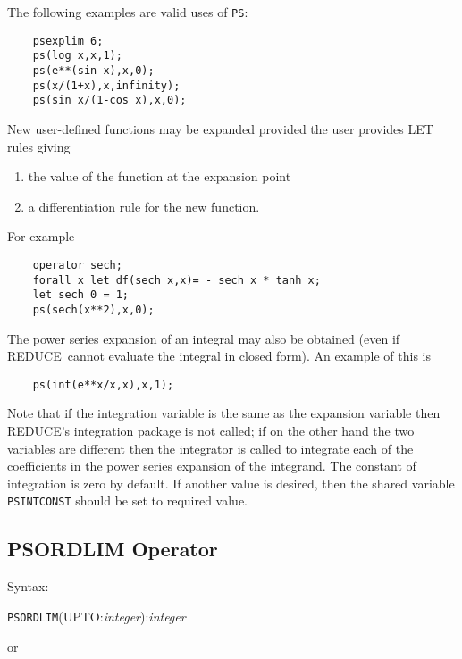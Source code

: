 \documentclass[11pt,letterpaper]{book}
\newcommand{\REDUCE}{REDUCE}
\begin{document}
\noindent The following examples are valid uses of {\tt PS}:
{\small\begin{verbatim}
    psexplim 6;
    ps(log x,x,1);
    ps(e**(sin x),x,0);
    ps(x/(1+x),x,infinity);
    ps(sin x/(1-cos x),x,0);
\end{verbatim}}

New user-defined functions may be expanded provided the user provides
LET rules giving

\begin{enumerate}
\item the value of the function at the expansion point
\item a differentiation rule for the new function.
\end{enumerate}

\noindent For example
{\small\begin{verbatim}
    operator sech;
    forall x let df(sech x,x)= - sech x * tanh x;
    let sech 0 = 1;
    ps(sech(x**2),x,0);
\end{verbatim}}

The power series expansion of an integral may also be obtained (even if
\REDUCE\ cannot evaluate the integral in closed form).  An example of
this is

{\small\begin{verbatim}
    ps(int(e**x/x,x),x,1);
\end{verbatim}}

Note that if the integration variable is the same as the expansion
variable then \REDUCE's integration package is not called; if on the
other hand the two variables are different then the integrator is
called to integrate each of the coefficients in the power series
expansion of the integrand.  The constant of integration is zero by
default.  If another value is desired, then the shared variable {\tt
PSINTCONST} should be set to required value.

\subsection{PSORDLIM Operator}

Syntax:

\hspace*{2em} {\tt PSORDLIM}(UPTO:{\em integer}):{\em integer}

\hspace*{4em} or
\end{document}

